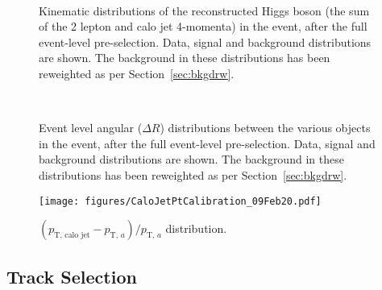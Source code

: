 \documentclass[NOTE, atlasdraft=true, texlive=2017, UKenglish]{\ATLASLATEXPATH atlasdoc}
\begin{document}
\begin{figure}[!htbp]
  \centering
  \\
  \caption{Kinematic distributions of the reconstructed Higgs boson (the sum of the 2 lepton and calo jet 4-momenta) in the event, after the full event-level pre-selection. Data, signal and background distributions are shown. The background in these distributions has been reweighted as per Section~\ref{sec:bkgdrw}.}
  \label{fig:higgskinematics}
\end{figure}

\begin{figure}[!htbp]
  \centering
  \\
  \caption{Event level angular ($\Delta R$) distributions between the various objects in the event, after the full event-level pre-selection. Data, signal and background distributions are shown. The background in these distributions has been reweighted as per Section~\ref{sec:bkgdrw}.}
  \label{fig:drdistributions}
\end{figure}

\begin{figure}[!htbp]
  \centering
  \texttt{[image: figures/CaloJetPtCalibration\_09Feb20.pdf]}
  \caption{$(p_\text{T, calo jet}-p_{\text{T, }a})/p_{\text{T, }a}$ distribution.}
  \label{fig:a0calibration}
\end{figure}


\subsection{Track Selection}
\label{sec:trackselection}
\end{document}
